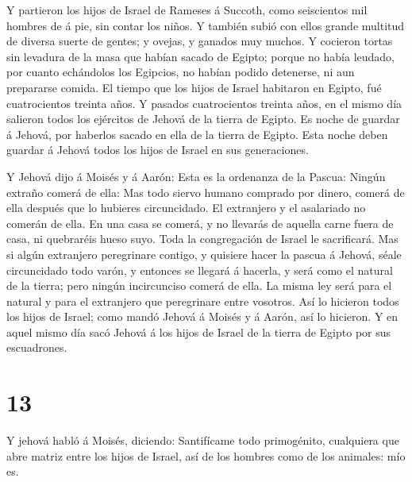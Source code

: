  Y partieron los hijos de Israel de Rameses á Succoth, como
seiscientos mil hombres de á pie, sin contar los niños.  Y
también subió con ellos grande multitud de diversa suerte de gentes; y
ovejas, y ganados muy muchos.  Y cocieron tortas sin
levadura de la masa que habían sacado de Egipto; porque no había
leudado, por cuanto echándolos los Egipcios, no habían podido detenerse,
ni aun prepararse comida.  El tiempo que los hijos de
Israel habitaron en Egipto, fué cuatrocientos treinta años.
 Y pasados cuatrocientos treinta años, en el mismo día
salieron todos los ejércitos de Jehová de la tierra de Egipto.
 Es noche de guardar á Jehová, por haberlos sacado en ella
de la tierra de Egipto. Esta noche deben guardar á Jehová todos los
hijos de Israel en sus generaciones.

 Y Jehová dijo á Moisés y á Aarón: Esta es la ordenanza de
la Pascua: Ningún extraño comerá de ella:  Mas todo siervo
humano comprado por dinero, comerá de ella después que lo hubieres
circuncidado.  El extranjero y el asalariado no comerán de
ella.  En una casa se comerá, y no llevarás de aquella
carne fuera de casa, ni quebraréis hueso suyo.  Toda la
congregación de Israel le sacrificará.  Mas si algún
extranjero peregrinare contigo, y quisiere hacer la pascua á Jehová,
séale circuncidado todo varón, y entonces se llegará á hacerla, y será
como el natural de la tierra; pero ningún incircunciso comerá de ella.
 La misma ley será para el natural y para el extranjero que
peregrinare entre vosotros.  Así lo hicieron todos los
hijos de Israel; como mandó Jehová á Moisés y á Aarón, así lo hicieron.
 Y en aquel mismo día sacó Jehová á los hijos de Israel de
la tierra de Egipto por sus escuadrones.

\hypertarget{section-12}{%
\section{13}\label{section-12}}

 Y jehová habló á Moisés, diciendo:  Santifícame
todo primogénito, cualquiera que abre matriz entre los hijos de Israel,
así de los hombres como de los animales: mío es.

